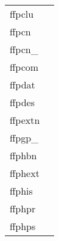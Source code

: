 \documentclass[11pt]{book}
\begin{document}
\begin{tabular}{lr}
ffpclu      & \pageref{ffpclu} \\
ffpcn    & \pageref{ffpcn} \\
ffpcn\_ & \pageref{ffpcnx} \\
ffpcom      & \pageref{ffpcom} \\
ffpdat         & \pageref{ffpdat} \\
ffpdes  & \pageref{ffpdes} \\
ffpextn        & \pageref{ffgextn} \\
ffpgp\_ & \pageref{ffpgpx} \\
ffphbn      & \pageref{ffphbn} \\
ffphext       & \pageref{ffphpr} \\
ffphis      & \pageref{ffphis} \\
ffphpr       & \pageref{ffphpr} \\
ffphps       & \pageref{ffphps} \\

\end{tabular}
\end{document}
